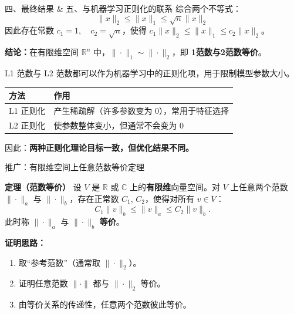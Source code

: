 \documentclass[aspectratio=169]{beamer}
\begin{document}
\begin{frame}{四、最终结果 \& 五、与机器学习正则化的联系}
    综合两个不等式：
    $$ \|x\|_2 \le \|x\|_1 \le \sqrt{n}\|x\|_2 $$
    因此存在常数 $c_1=1,\quad c_2=\sqrt{n}$，使得 $c_1\|x\|_2 \le \|x\|_1 \le c_2\|x\|_2$。
    
    \textbf{结论：}在有限维空间 $\mathbb{R}^n$ 中，$\|\cdot\|_1 \sim \|\cdot\|_2$，即 \textbf{1范数与2范数等价}。
    
    \vspace{0.4cm}
    L1 范数与 L2 范数都可以作为机器学习中的正则化项，用于限制模型参数大小。
    
    \begin{table}[]
        \centering
        \begin{tabular}{|l|l|}
        \hline
        \textbf{方法} & \textbf{作用} \\ \hline
        L1 正则化 & 产生稀疏解（许多参数变为 0），常用于特征选择 \\ \hline
        L2 正则化 & 使参数整体变小，但通常不会变为 0 \\ \hline
        \end{tabular}
    \end{table}
    
    因此：\textbf{两种正则化理论目标一致，但优化结果不同。}
\end{frame}

\begin{frame}{推广：有限维空间上任意范数等价定理}
    \begin{block}{\textbf{定理（范数等价）}}
        设 $V$ 是 $\mathbb{R}$ 或 $\mathbb{C}$ 上的\textbf{有限维}向量空间。对 $V$ 上任意两个范数 $\|\cdot\|_a$ 与 $\|\cdot\|_b$，存在正常数 $C_1,\,C_2$，使得对所有 $v \in V$：
        \[
        C_1 \|v\|_b \le \|v\|_a \le C_2 \|v\|_b.
        \]
        此时称 $\|\cdot\|_a$ 与 $\|\cdot\|_b$ \textbf{等价}。
    \end{block}
    \vspace{0.3cm}
    \textbf{证明思路：}
    \begin{enumerate}
        \item 取“参考范数”（通常取 $\|\cdot\|_2$）。
        \item 证明任意范数 $\|\cdot\|$ 都与 $\|\cdot\|_2$ 等价。
        \item 由等价关系的传递性，任意两个范数彼此等价。
    \end{enumerate}
\end{frame}
\end{document}
